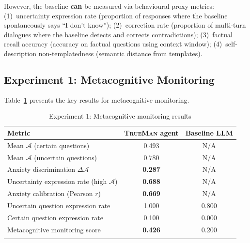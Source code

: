 \documentclass[pdflatex,sn-mathphys-num]{sn-jnl}
\newcommand{\TrueMan}{\textsc{TrueMan}}
\newcommand{\anxiety}{\mathcal{A}}
\theoremstyle{thmstyleone}%
\theoremstyle{thmstyletwo}%
\theoremstyle{thmstylethree}%
\begin{document}
However, the baseline \textbf{can} be measured via behavioural proxy metrics: (1)~uncertainty expression rate (proportion of responses where the baseline spontaneously says ``I don't know''); (2)~correction rate (proportion of multi-turn dialogues where the baseline detects and corrects contradictions); (3)~factual recall accuracy (accuracy on factual questions using context window); (4)~self-description non-templatedness (semantic distance from templates).

\subsection{Experiment 1: Metacognitive Monitoring}

Table~\ref{tab:exp1_results} presents the key results for metacognitive monitoring.

\begin{table}[h]
\caption{Experiment 1: Metacognitive monitoring results}\label{tab:exp1_results}%
\begin{tabular}{@{}lcc@{}}
\toprule
Metric & \TrueMan{} agent & Baseline LLM \\
\midrule
Mean $\anxiety$ (certain questions) & 0.493 & N/A\footnotemark[1] \\
Mean $\anxiety$ (uncertain questions) & 0.780 & N/A\footnotemark[1] \\
Anxiety discrimination $\Delta\anxiety$ & \textbf{0.287} & N/A\footnotemark[1] \\
Uncertainty expression rate (high $\anxiety$) & \textbf{0.688} & N/A\footnotemark[2] \\
Anxiety calibration (Pearson $r$) & \textbf{0.669} & N/A\footnotemark[1] \\
Uncertain question expression rate & 1.000 & 0.800 \\
Certain question expression rate & 0.100 & 0.000 \\
\midrule
Metacognitive monitoring score & \textbf{0.426} & 0.200\footnotemark[3] \\
\botrule
\end{tabular}
\end{table}
\end{document}
